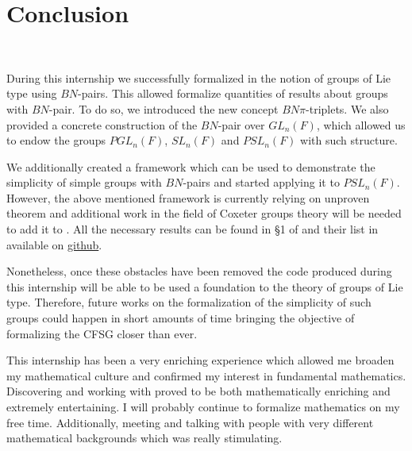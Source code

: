 \section{Conclusion} \

    During this internship we successfully formalized in \Lean the notion of groups of Lie type using $BN$-pairs. This allowed formalize quantities of results about groups with $BN$-pair. To do so, we introduced the new concept $BN\pi$-triplets. We also provided a concrete construction of the $BN$-pair over $GL_n\left( F \right)$, which allowed us to endow the groups $PGL_n(F)$, $SL_n(F)$ and $PSL_n(F)$ with such structure. 

    We additionally created a framework which can be used to demonstrate the simplicity of simple groups with $BN$-pairs and started applying it to $PSL_n(F)$.
    However, the above mentioned framework is currently relying on unproven theorem and additional work in the field of Coxeter groups theory will be needed to add it to . All the necessary results can be found in §1 of \cite{bourbaki_groupes_2007} and their list in available on \href{https://github.com/corent1234/BNpairs}{github}.

    Nonetheless, once these obstacles have been removed the code produced during this internship will be able to be used a foundation to the theory of groups of Lie type. Therefore, future works on the formalization of the simplicity of such groups could happen in short amounts of time bringing the objective of formalizing the CFSG closer than ever.

    This internship has been a very enriching experience which allowed me broaden my mathematical culture and confirmed my interest in fundamental mathematics. Discovering and working with \Lean proved to be both mathematically enriching and extremely entertaining. I will probably continue to formalize mathematics on my free time. Additionally, meeting and talking with people with very different mathematical backgrounds which was really stimulating. \vspace{-.5em} 
